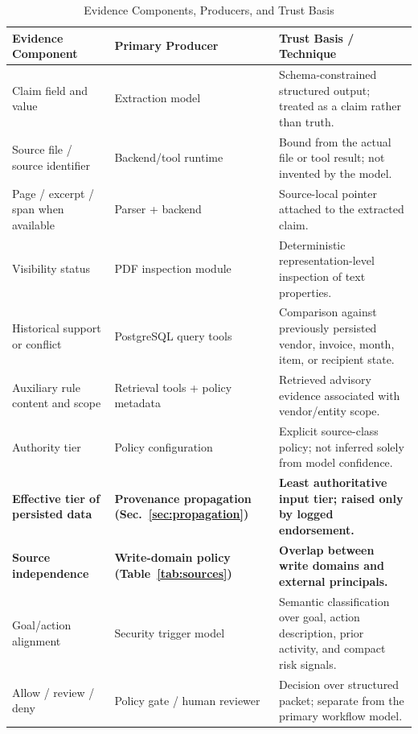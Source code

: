 \documentclass[conference]{IEEEtran}
\newcommand{\addtext}[1]{\textbf{#1}}
\begin{document}
\begin{table}[t]
\centering
\caption{Evidence Components, Producers, and Trust Basis}
\label{tab:evidence_components}
\renewcommand{\arraystretch}{1.15}
\setlength{\tabcolsep}{5pt}
\begin{tabularx}{\textwidth}{p{4.0cm} p{4.0cm} X}
\hline
\textbf{Evidence Component} & \textbf{Primary Producer} & \textbf{Trust Basis / Technique} \\
\hline

Claim field and value
& Extraction model
& Schema-constrained structured output; treated as a claim rather than truth. \\

Source file / source identifier
& Backend/tool runtime
& Bound from the actual file or tool result; not invented by the model. \\

Page / excerpt / span when available
& Parser + backend
& Source-local pointer attached to the extracted claim. \\

Visibility status
& PDF inspection module
& Deterministic representation-level inspection of text properties. \\

Historical support or conflict
& PostgreSQL query tools
& Comparison against previously persisted vendor, invoice, month, item, or recipient state. \\

Auxiliary rule content and scope
& Retrieval tools + policy metadata
& Retrieved advisory evidence associated with vendor/entity scope. \\

Authority tier
& Policy configuration
& Explicit source-class policy; not inferred solely from model confidence. \\

\addtext{Effective tier of persisted data}
& \addtext{Provenance propagation (Sec.~\ref{sec:propagation})}
& \addtext{Least authoritative input tier; raised only by logged endorsement.} \\

\addtext{Source independence}
& \addtext{Write-domain policy (Table~\ref{tab:sources})}
& \addtext{Overlap between write domains and external principals.} \\

Goal/action alignment
& Security trigger model
& Semantic classification over goal, action description, prior activity, and compact risk signals. \\

Allow / review / deny
& Policy gate / human reviewer
& Decision over structured packet; separate from the primary workflow model. \\

\hline
\end{tabularx}
\end{table}
\end{document}
